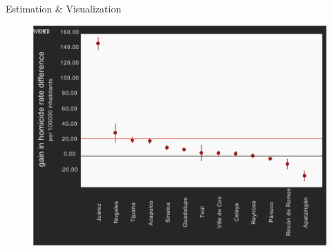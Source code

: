 \documentclass[final]{beamer}
\newlength{\onecolwid}
\newlength{\threecolwid}
\begin{document}
\begin{frame}[t]
\begin{columns}[t]
\begin{column}{\threecolwid}
\begin{block}{Estimation \& Visualization}
\begin{figure}[htdp]
{					   	\includegraphics[scale=1.1]{../Images/results.png}
					}
			\end{figure}
			
	

				
	 \end{block}
      \begin{columns}[t,totalwidth=\threecolwid]	%
        \begin{column}{\onecolwid}


\end{column}
\end{columns}
\end{column}
\end{columns}
\end{frame}
\end{document}
